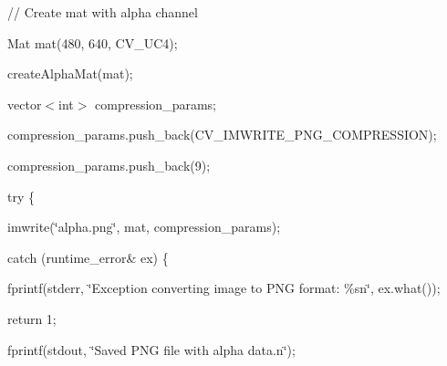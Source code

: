 {\ttfamily }

{\ttfamily }

{\ttfamily // Create mat with alpha channel}

{\ttfamily }

{\ttfamily }

{\ttfamily Mat mat(480, 640, C\+V\+\_\+U\+C4);}

{\ttfamily }

{\ttfamily }

{\ttfamily create\+Alpha\+Mat(mat);}

{\ttfamily }

{\ttfamily }

{\ttfamily vector$<$int$>$ compression\+\_\+params;}

{\ttfamily }

{\ttfamily }

{\ttfamily compression\+\_\+params.\+push\+\_\+back(\+C\+V\+\_\+\+I\+M\+W\+R\+I\+T\+E\+\_\+\+P\+N\+G\+\_\+\+C\+O\+M\+P\+R\+E\+S\+S\+I\+O\+N);}

{\ttfamily }

{\ttfamily }

{\ttfamily compression\+\_\+params.\+push\+\_\+back(9);}

{\ttfamily }

{\ttfamily }

{\ttfamily try \{}

{\ttfamily }

{\ttfamily }

{\ttfamily imwrite(\char`\"{}alpha.\+png\char`\"{}, mat, compression\+\_\+params);}

{\ttfamily }

{\ttfamily }

{\ttfamily catch (runtime\+\_\+error\& ex) \{}

{\ttfamily }

{\ttfamily }

{\ttfamily fprintf(stderr, \char`\"{}\+Exception converting image to P\+N\+G format\+: \%sn\char`\"{}, ex.\+what());}

{\ttfamily }

{\ttfamily }

{\ttfamily return 1;}

{\ttfamily }

{\ttfamily }

{\ttfamily fprintf(stdout, \char`\"{}\+Saved P\+N\+G file with alpha data.\+n\char`\"{});}

{\ttfamily }

